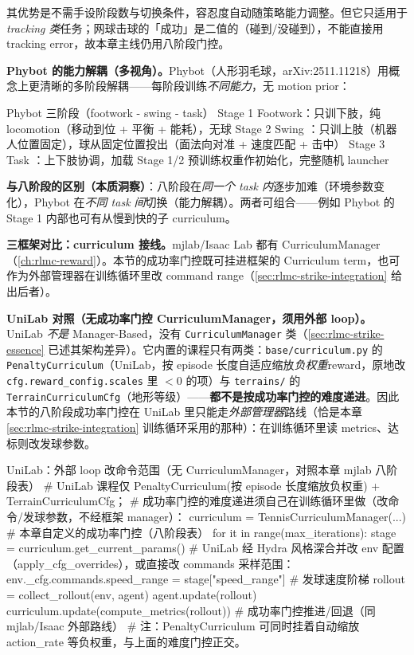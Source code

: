 其优势是不需手设阶段数与切换条件，容忍度自动随策略能力调整。但它只适用于\emph{tracking 类}任务；网球击球的「成功」是二值的（碰到/没碰到），不能直接用 tracking error，故本章主线仍用八阶段门控。

\textbf{Phybot 的能力解耦（多视角）。}Phybot（人形羽毛球，arXiv:2511.11218）用概念上更清晰的多阶段解耦——每阶段训练\emph{不同能力}，无 motion prior：

\begin{codebox}[text]{Phybot 三阶段（footwork - swing - task）}
Stage 1 Footwork：只训下肢，纯 locomotion（移动到位 + 平衡 + 能耗），无球
Stage 2 Swing   ：只训上肢（机器人位置固定），球从固定位置投出（面法向对准 + 速度匹配 + 击中）
Stage 3 Task    ：上下肢协调，加载 Stage 1/2 预训练权重作初始化，完整随机 launcher
\end{codebox}

\textbf{与八阶段的区别（本质洞察）}：八阶段在\emph{同一个 task 内}逐步加难（环境参数变化），Phybot 在\emph{不同 task 间}切换（能力解耦）。两者可组合——例如 Phybot 的 Stage 1 内部也可有从慢到快的子 curriculum。

\textbf{三框架对比：curriculum 接线。}mjlab/Isaac Lab 都有 CurriculumManager（\cref{ch:rlmc-reward}）。本节的成功率门控既可挂进框架的 Curriculum term，也可作为外部管理器在训练循环里改 command range（\cref{sec:rlmc-strike-integration} 给出后者）。

\textbf{UniLab 对照（无成功率门控 CurriculumManager，须用外部 loop）。}UniLab \emph{不是} Manager-Based，没有 \verb|CurriculumManager| 类（\cref{sec:rlmc-strike-essence} 已述其架构差异）。它内置的课程只有两类：\verb|base/curriculum.py| 的 \verb|PenaltyCurriculum|（UniLab，按 episode 长度自适应缩放\emph{负权重}reward，原地改 \verb|cfg.reward_config.scales| 里 $<0$ 的项）与 \verb|terrains/| 的 \verb|TerrainCurriculumCfg|（地形等级）——\textbf{都不是按成功率门控的难度递进}。因此本节的八阶段成功率门控在 UniLab 里只能走\emph{外部管理器}路线（恰是本章 \cref{sec:rlmc-strike-integration} 训练循环采用的那种）：在训练循环里读 metrics、达标则改发球参数。

\begin{codebox}[Python]{UniLab：外部 loop 改命令范围（无 CurriculumManager，对照本章 mjlab 八阶段表）}
# UniLab 课程仅 PenaltyCurriculum(按 episode 长度缩放负权重) + TerrainCurriculumCfg；
# 成功率门控的难度递进须自己在训练循环里做（改命令/发球参数，不经框架 manager）：
curriculum = TennisCurriculumManager(...)        # 本章自定义的成功率门控（八阶段表）
for it in range(max_iterations):
    stage = curriculum.get_current_params()
    # UniLab 经 Hydra 风格深合并改 env 配置（apply_cfg_overrides），或直接改 commands 采样范围：
    env._cfg.commands.speed_range = stage["speed_range"]      # 发球速度阶梯
    rollout = collect_rollout(env, agent)
    agent.update(rollout)
    curriculum.update(compute_metrics(rollout))   # 成功率门控推进/回退（同 mjlab/Isaac 外部路线）
# 注：PenaltyCurriculum 可同时挂着自动缩放 action_rate 等负权重，与上面的难度门控正交。
\end{codebox}

